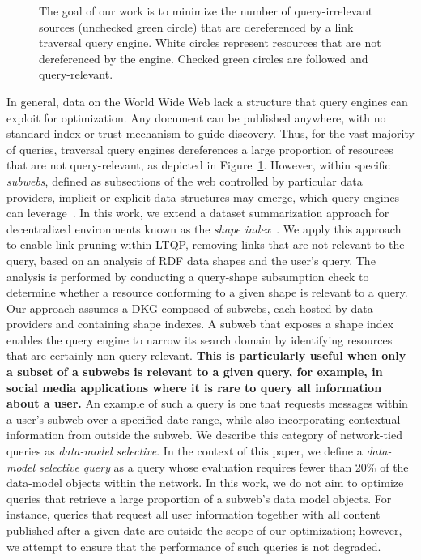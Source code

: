 \begin{figure}
    \centering
    
    \caption{
    The goal of our work is to minimize the number of query-irrelevant sources (unchecked green circle) that are dereferenced by a link traversal query engine.
    White circles represent resources that are not dereferenced by the engine.
    Checked green circles are followed and query-relevant.
    }
    \label{fig:situation}
\end{figure}

In general, data on the World Wide Web lack a structure that query engines can exploit for optimization.  
Any document can be published anywhere, with no standard index or trust mechanism to guide discovery.
Thus, for the vast majority of queries, traversal query engines dereferences a large proportion of resources that are not query-relevant, as depicted in Figure~\ref{fig:situation}.
However, within specific \emph{subwebs}, defined as subsections of the web controlled by particular data providers, implicit or explicit data structures may emerge, which query engines can leverage~\cite{Bogaerts2021LinkTW}.
In this work, we extend a dataset summarization approach for decentralized environments known as the \emph{shape index}~\cite{tam2024opportunitiesshapebasedoptimizationlink}.
We apply this approach to enable link pruning within LTQP, removing links that are not relevant to the query, based on an analysis of RDF data shapes and the user's query.
The analysis is performed by conducting a query-shape subsumption check to determine whether a resource conforming to a given shape is relevant to a query.
Our approach assumes a DKG composed of subwebs, each hosted by data providers and containing shape indexes.
A subweb that exposes a shape index enables the query engine to narrow its search domain by identifying resources that are certainly non-query-relevant.
\textbf{This is particularly useful when only a subset of a subwebs is relevant to a given query, for example, in social media applications where it is rare to query all information about a user.}
An example of such a query is one that requests messages within a user's subweb over a specified date range, while also incorporating contextual information from outside the subweb.
We describe this category of network-tied queries as \emph{data-model selective}.
In the context of this paper, we define a \emph{data-model selective query} as a query whose evaluation requires fewer than 20\% of the data-model objects within the network.
In this work, we do not aim to optimize queries that retrieve a large proportion of a subweb's data model objects.  
For instance, queries that request all user information together with all content published after a given date are outside the scope of our optimization; however, we attempt to ensure that the performance of such queries is not degraded.  

